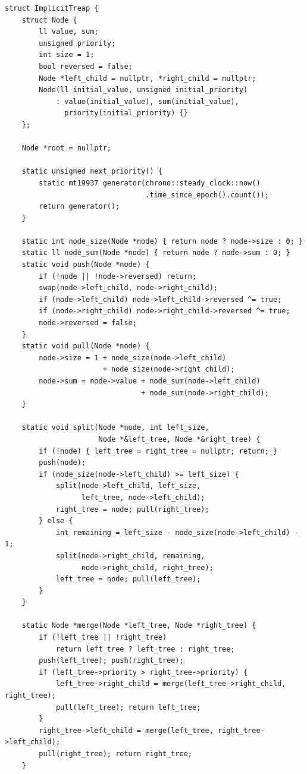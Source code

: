 \begin{lstlisting}[style=cpp]
struct ImplicitTreap {
    struct Node {
        ll value, sum;
        unsigned priority;
        int size = 1;
        bool reversed = false;
        Node *left_child = nullptr, *right_child = nullptr;
        Node(ll initial_value, unsigned initial_priority)
            : value(initial_value), sum(initial_value),
              priority(initial_priority) {}
    };

    Node *root = nullptr;

    static unsigned next_priority() {
        static mt19937 generator(chrono::steady_clock::now()
                                 .time_since_epoch().count());
        return generator();
    }

    static int node_size(Node *node) { return node ? node->size : 0; }
    static ll node_sum(Node *node) { return node ? node->sum : 0; }
    static void push(Node *node) {
        if (!node || !node->reversed) return;
        swap(node->left_child, node->right_child);
        if (node->left_child) node->left_child->reversed ^= true;
        if (node->right_child) node->right_child->reversed ^= true;
        node->reversed = false;
    }
    static void pull(Node *node) {
        node->size = 1 + node_size(node->left_child)
                       + node_size(node->right_child);
        node->sum = node->value + node_sum(node->left_child)
                                + node_sum(node->right_child);
    }

    static void split(Node *node, int left_size,
                      Node *&left_tree, Node *&right_tree) {
        if (!node) { left_tree = right_tree = nullptr; return; }
        push(node);
        if (node_size(node->left_child) >= left_size) {
            split(node->left_child, left_size,
                  left_tree, node->left_child);
            right_tree = node; pull(right_tree);
        } else {
            int remaining = left_size - node_size(node->left_child) - 1;
            split(node->right_child, remaining,
                  node->right_child, right_tree);
            left_tree = node; pull(left_tree);
        }
    }

    static Node *merge(Node *left_tree, Node *right_tree) {
        if (!left_tree || !right_tree)
            return left_tree ? left_tree : right_tree;
        push(left_tree); push(right_tree);
        if (left_tree->priority > right_tree->priority) {
            left_tree->right_child = merge(left_tree->right_child, right_tree);
            pull(left_tree); return left_tree;
        }
        right_tree->left_child = merge(left_tree, right_tree->left_child);
        pull(right_tree); return right_tree;
    }


\end{lstlisting}
